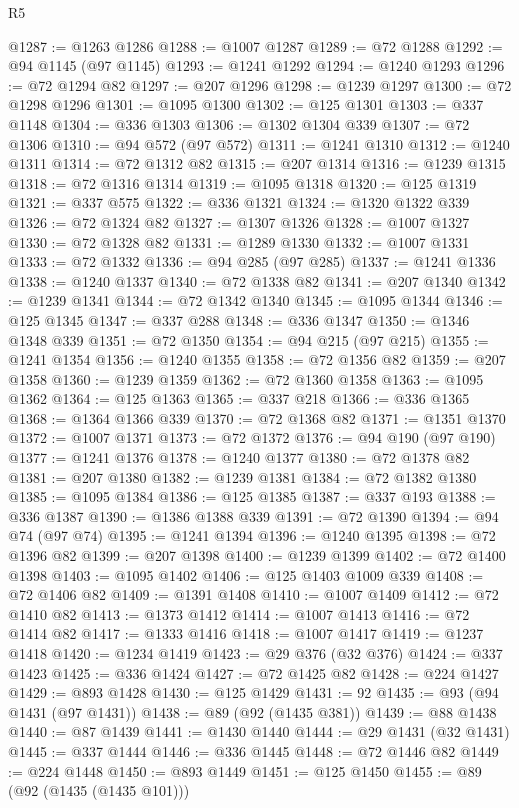 \begin{lexlean}{R5}
\begin{coremodule}
{{{{{{{{{{{{{{{{{{{{{{{{{{{{{{{{{{{{{{{{{{{{{{{{{{{{{{{{{{{{{{{{{{{{{{{{{{{{{{{{{{{{{{{{{{{{@1287 := @1263 @1286
@1288 := @1007 @1287
@1289 := @72 @1288
@1292 := @94 @1145 (@97 @1145)
@1293 := @1241 @1292
@1294 := @1240 @1293
@1296 := @72 @1294 @82
@1297 := @207 @1296
@1298 := @1239 @1297
@1300 := @72 @1298 @1296
@1301 := @1095 @1300
@1302 := @125 @1301
@1303 := @337 @1148
@1304 := @336 @1303
@1306 := @1302 @1304 @339
@1307 := @72 @1306
@1310 := @94 @572 (@97 @572)
@1311 := @1241 @1310
@1312 := @1240 @1311
@1314 := @72 @1312 @82
@1315 := @207 @1314
@1316 := @1239 @1315
@1318 := @72 @1316 @1314
@1319 := @1095 @1318
@1320 := @125 @1319
@1321 := @337 @575
@1322 := @336 @1321
@1324 := @1320 @1322 @339
@1326 := @72 @1324 @82
@1327 := @1307 @1326
@1328 := @1007 @1327
@1330 := @72 @1328 @82
@1331 := @1289 @1330
@1332 := @1007 @1331
@1333 := @72 @1332
@1336 := @94 @285 (@97 @285)
@1337 := @1241 @1336
@1338 := @1240 @1337
@1340 := @72 @1338 @82
@1341 := @207 @1340
@1342 := @1239 @1341
@1344 := @72 @1342 @1340
@1345 := @1095 @1344
@1346 := @125 @1345
@1347 := @337 @288
@1348 := @336 @1347
@1350 := @1346 @1348 @339
@1351 := @72 @1350
@1354 := @94 @215 (@97 @215)
@1355 := @1241 @1354
@1356 := @1240 @1355
@1358 := @72 @1356 @82
@1359 := @207 @1358
@1360 := @1239 @1359
@1362 := @72 @1360 @1358
@1363 := @1095 @1362
@1364 := @125 @1363
@1365 := @337 @218
@1366 := @336 @1365
@1368 := @1364 @1366 @339
@1370 := @72 @1368 @82
@1371 := @1351 @1370
@1372 := @1007 @1371
@1373 := @72 @1372
@1376 := @94 @190 (@97 @190)
@1377 := @1241 @1376
@1378 := @1240 @1377
@1380 := @72 @1378 @82
@1381 := @207 @1380
@1382 := @1239 @1381
@1384 := @72 @1382 @1380
@1385 := @1095 @1384
@1386 := @125 @1385
@1387 := @337 @193
@1388 := @336 @1387
@1390 := @1386 @1388 @339
@1391 := @72 @1390
@1394 := @94 @74 (@97 @74)
@1395 := @1241 @1394
@1396 := @1240 @1395
@1398 := @72 @1396 @82
@1399 := @207 @1398
@1400 := @1239 @1399
@1402 := @72 @1400 @1398
@1403 := @1095 @1402
@1406 := @125 @1403 @1009 @339
@1408 := @72 @1406 @82
@1409 := @1391 @1408
@1410 := @1007 @1409
@1412 := @72 @1410 @82
@1413 := @1373 @1412
@1414 := @1007 @1413
@1416 := @72 @1414 @82
@1417 := @1333 @1416
@1418 := @1007 @1417
@1419 := @1237 @1418
@1420 := @1234 @1419
@1423 := @29 @376 (@32 @376)
@1424 := @337 @1423
@1425 := @336 @1424
@1427 := @72 @1425 @82
@1428 := @224 @1427
@1429 := @893 @1428
@1430 := @125 @1429
@1431 := 92
@1435 := @93 (@94 @1431 (@97 @1431))
@1438 := @89 (@92 (@1435 @381))
@1439 := @88 @1438
@1440 := @87 @1439
@1441 := @1430 @1440
@1444 := @29 @1431 (@32 @1431)
@1445 := @337 @1444
@1446 := @336 @1445
@1448 := @72 @1446 @82
@1449 := @224 @1448
@1450 := @893 @1449
@1451 := @125 @1450
@1455 := @89 (@92 (@1435 (@1435 @101)))
}}}}}}}}}}}}}}}}}}}}}}}}}}}}}}}}}}}}}}}}}}}}}}}}}}}}}}}}}}}}}}}}}}}}}}}}}}}}}}}}}}}}}}}}}}}}
\end{coremodule}
\end{lexlean}
